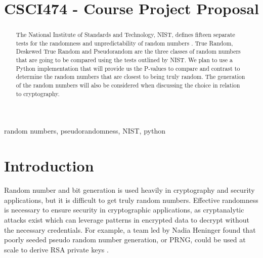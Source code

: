 \documentclass[11pt,letterpaper,conference]{IEEEtran}
\begin{document}
\title{CSCI474 - Course Project Proposal}

\author{
\and
{}
\and
{}
\and
{}
\and
{}
\and
{}
}

\maketitle

\begin{abstract}
The National Institute of Standards and Technology, NIST, defines fifteen separate tests
for the randomness and unpredictability of random numbers \cite{nistbook}. True Random, Deskewed True
Random and Pseudorandom are the three classes of random numbers that are going to be
compared using the tests outlined by NIST. We plan to use a Python implementation that will
provide us the P-values to compare and contrast to determine the random numbers that are
closest to being truly random. The generation of the random numbers will also be considered
when discussing the choice in relation to cryptography.
\end{abstract}

\begin{IEEEkeywords}
random numbers, pseudorandomness, NIST, python
\end{IEEEkeywords}

\section{Introduction}
Random number and bit generation is used heavily in cryptography and security applications, but it
is difficult to get truly random numbers. Effective randomness is necessary to ensure security in
cryptographic applications, as cryptanalytic attacks exist which can leverage patterns in encrypted
data to decrypt without the necessary credentials. For example, a team led by Nadia Heninger found
that poorly seeded pseudo random number generation, or PRNG, could be used at scale to derive RSA
private keys \cite{heninger2012mining}.
\end{document}
